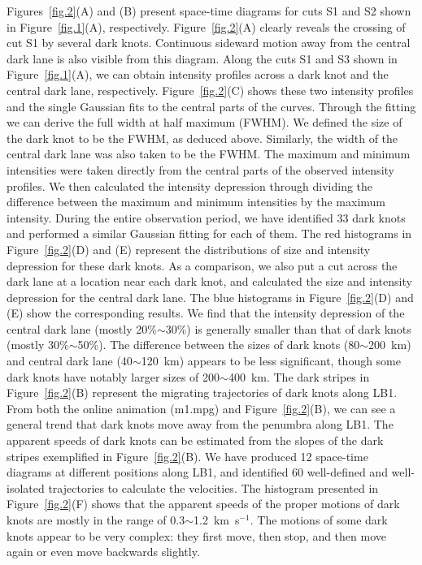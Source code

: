 \documentclass[preprint2]{aastex}
\begin{document}
Figures~\ref{fig.2}(A) and (B) present space-time diagrams for cuts S1 and S2 shown in Figure~\ref{fig.1}(A), respectively. Figure~\ref{fig.2}(A) clearly reveals the crossing of cut S1 by several dark knots. Continuous sideward motion away from the central dark lane is also visible from this diagram. Along the cuts S1 and S3 shown in Figure~\ref{fig.1}(A), we can obtain intensity profiles across a dark knot and the central dark lane, respectively. Figure~\ref{fig.2}(C) shows these two intensity profiles and the single Gaussian fits to the central parts of the curves.  Through the fitting we can derive the full width at half maximum (FWHM). We defined the size of the dark knot to be the FWHM, as deduced above. Similarly, the width of the central dark lane was also taken to be the FWHM. The maximum and minimum intensities were taken directly from the central parts of the observed intensity profiles. We then calculated the intensity depression through dividing the difference between the maximum and minimum intensities by the maximum intensity. During the entire observation period, we have identified 33 dark knots and performed a similar Gaussian fitting for each of them. The red histograms in Figure~\ref{fig.2}(D) and (E) represent the distributions of size and intensity depression for these dark knots. As a comparison, we also put a cut across the dark lane at a location near each dark knot, and calculated the size and intensity depression for the central dark lane. The blue histograms in Figure~\ref{fig.2}(D) and (E) show the corresponding results. We find that the intensity depression of the central dark lane (mostly 20\%$\sim$30\%) is generally smaller than that of dark knots (mostly 30\%$\sim$50\%). The difference between the sizes of dark knots (80$\sim$200~km) and central dark lane (40$\sim$120~km) appears to be less significant, though some dark knots have notably larger sizes of 200$\sim$400~km. The dark stripes in Figure~\ref{fig.2}(B) represent the migrating trajectories of dark knots along LB1. From both the online animation (m1.mpg) and Figure~\ref{fig.2}(B), we can see a general trend that dark knots move away from the penumbra along LB1. The apparent speeds of dark knots can be estimated from the slopes of the dark stripes exemplified in Figure~\ref{fig.2}(B). We have produced 12 space-time diagrams at different positions along LB1, and identified 60 well-defined and well-isolated trajectories to calculate the velocities. The histogram presented in Figure~\ref{fig.2}(F) shows that the apparent speeds of the  proper motions of dark knots are mostly in the range of 0.3$\sim$1.2~km~s$^{-1}$. The motions of some dark knots appear to be very complex: they first move, then stop, and then move again or even move backwards slightly.
\end{document}
